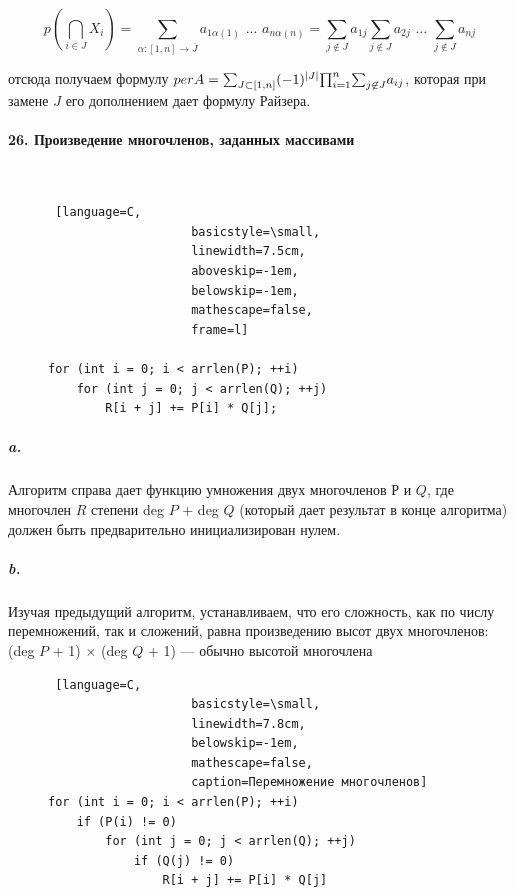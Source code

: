 \documentclass{../../template/mai_book}
\DeclarePairedDelimiter{\abs}{\lvert}{\rvert}
\begin{document}
\begin{equation*}
p(\bigcap_{i \in J} X_i) = \sum_{\alpha : [1, n] \rightarrow \overline{J}} a_{1\alpha(1)} \text{ ... } a_{n\alpha(n)} = \sum_{j \not\in J} a_{1j} \sum_{j \not\in J} a_{2j} \text{ ... } \sum_{j \not\in J} a_{nj}
\end{equation*}

\noindent
отсюда получаем формулу $per A = {\sum}_{J \subset [1, n]} (-1)^{\abs{J}} {\prod}_{i = 1}^n {\sum}_{j \not\in J} a_{ij}$, которая при замене $J$ его дополнением дает формулу Райзера.

\paragraph{26. Произведение многочленов, заданных массивами} \mbox{}\\

\begin{figure}
\begin{lstlisting} [language=C,
					basicstyle=\small,
					linewidth=7.5cm,
					aboveskip=-1em,
					belowskip=-1em,
					mathescape=false,
					frame=l]
					
for (int i = 0; i < arrlen(P); ++i)
	for (int j = 0; j < arrlen(Q); ++j)
		R[i + j] += P[i] * Q[j];
\end{lstlisting}
\end{figure}

\subparagraph{a.} Алгоритм справа дает \linebreak функцию умножения двух многочленов $Р$ и $Q$, где многочлен $R$ степени deg $P$ + deg $Q$ (который дает результат в конце алгоритма) должен быть предварительно инициализирован нулем. \newline

\subparagraph{b.} Изучая предыдущий алгоритм, устанавливаем, что его сложность, как по числу перемножений, так и сложений, равна произведению высот двух многочленов: (deg $P$ + 1) $\times$ (deg $Q$ + 1) — обычно высотой многочлена \linebreak

\newpage


\begin{figure}
\begin{lstlisting} [language=C,
					basicstyle=\small,
					linewidth=7.8cm,
					belowskip=-1em,
					mathescape=false,
					caption=Перемножение многочленов]
for (int i = 0; i < arrlen(P); ++i)
	if (P(i) != 0)
		for (int j = 0; j < arrlen(Q); ++j)
			if (Q(j) != 0)
				R[i + j] += P[i] * Q[j]
\end{lstlisting}
\end{figure}
\end{document}
